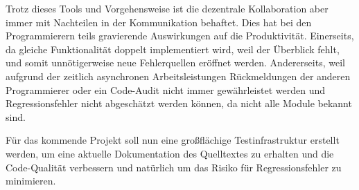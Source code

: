 Trotz dieses Tools und Vorgehensweise ist die dezentrale Kollaboration aber immer mit Nachteilen in der Kommunikation behaftet. Dies hat bei den Programmierern teils gravierende Auswirkungen auf die Produktivität. Einerseits, da gleiche Funktionalität doppelt implementiert wird, weil der Überblick fehlt, und somit unnötigerweise neue Fehlerquellen eröffnet werden. Andererseits, weil aufgrund der zeitlich asynchronen Arbeitsleistungen Rückmeldungen der anderen Programmierer oder ein Code-Audit nicht immer gewährleistet werden und Regressionsfehler nicht abgeschätzt werden können, da nicht alle Module bekannt sind.


Für das kommende Projekt soll nun eine großflächige Testinfrastruktur erstellt werden, um eine aktuelle Dokumentation des Quelltextes zu erhalten und die Code-Qualität verbessern und natürlich um das Risiko für Regressionsfehler zu minimieren.
